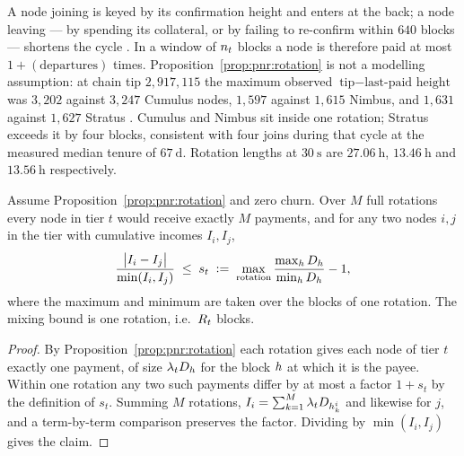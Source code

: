 \begin{remark}
\label{rem:pnr:churn}
A node joining is keyed by its confirmation height and enters at the back; a node leaving --- by
spending its collateral, or by failing to re-confirm within $640$ blocks --- shortens the cycle
\shipped {}. In a window of $n_{t}$ blocks a node
is therefore paid at most $1 + (\text{departures})$ times. Proposition~\ref{prop:pnr:rotation} is
not a modelling assumption: at chain tip $2{,}917{,}115$ the maximum observed
$\text{tip} - \text{last-paid height}$ was $3{,}202$ against $3{,}247$ Cumulus nodes, $1{,}597$
against $1{,}615$ Nimbus, and $1{,}631$ against $1{,}627$ Stratus
. Cumulus and Nimbus sit inside one
rotation; Stratus exceeds it by four blocks, consistent with four joins during that cycle at the
measured median tenure of $\SI{67}{\day}$. Rotation lengths at $\SI{30}{\second}$ are
$\SI{27.06}{\hour}$, $\SI{13.46}{\hour}$ and $\SI{13.56}{\hour}$ respectively.
\end{remark}

\begin{proposition}
\label{prop:pnr:within}
Assume Proposition~\ref{prop:pnr:rotation} and zero churn. Over $M$ full rotations every node in
tier $t$ would receive exactly $M$ \PNR payments, and for any two nodes $i, j$ in the tier with
cumulative \PNR incomes $I_i, I_j$,
\[
  \frac{\big|I_i - I_j\big|}{\min(I_i, I_j)} \;\le\; s_t
  \;\vcentcolon=\; \max_{\text{rotation}} \frac{\max_{h} D_{h}}{\min_{h} D_{h}} - 1 ,
\]
where the maximum and minimum are taken over the blocks of one rotation. The mixing bound is one
rotation, i.e.\ $R_{t}$ blocks.
\end{proposition}

\begin{proof}
By Proposition~\ref{prop:pnr:rotation} each rotation gives each node of tier $t$ exactly one payment,
of size $\lambda_{t} D_{h}$ for the block $h$ at which it is the payee. Within one rotation
any two such payments differ by at most a factor $1 + s_t$ by the definition of $s_t$. Summing $M$
rotations, $I_i = \sum_{k=1}^{M}\lambda_{t}D_{h_k^{i}}$ and likewise for $j$, and a
term-by-term comparison preserves the factor. Dividing by $\min(I_i, I_j)$ gives the claim.
\end{proof}

